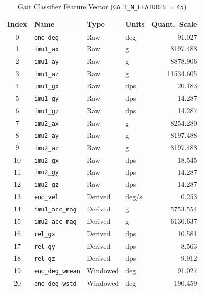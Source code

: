 \documentclass[11pt]{article}
\begin{document}
\begin{table}[H]
\centering
\caption{Gait Classifier Feature Vector (\texttt{GAIT\_N\_FEATURES = 45})}
\label{tab:gait_features}
\small
\begin{tabular}{clllr}
\toprule
\textbf{Index} & \textbf{Name} & \textbf{Type} & \textbf{Units} & \textbf{Quant.\ Scale} \\
\midrule
 0  & \texttt{enc\_deg}        & Raw      & deg   &     91.027 \\
 1  & \texttt{imu1\_ax}        & Raw      & g     &   8197.488 \\
 2  & \texttt{imu1\_ay}        & Raw      & g     &   8878.906 \\
 3  & \texttt{imu1\_az}        & Raw      & g     &  11534.605 \\
 4  & \texttt{imu1\_gx}        & Raw      & dps   &     20.183 \\
 5  & \texttt{imu1\_gy}        & Raw      & dps   &     14.287 \\
 6  & \texttt{imu1\_gz}        & Raw      & dps   &     14.287 \\
 7  & \texttt{imu2\_ax}        & Raw      & g     &   8254.280 \\
 8  & \texttt{imu2\_ay}        & Raw      & g     &   8197.488 \\
 9  & \texttt{imu2\_az}        & Raw      & g     &   8197.488 \\
10  & \texttt{imu2\_gx}        & Raw      & dps   &     18.545 \\
11  & \texttt{imu2\_gy}        & Raw      & dps   &     14.287 \\
12  & \texttt{imu2\_gz}        & Raw      & dps   &     14.287 \\
\midrule
13  & \texttt{enc\_vel}        & Derived  & deg/s &      0.253 \\
14  & \texttt{imu1\_acc\_mag}  & Derived  & g     &   5753.554 \\
15  & \texttt{imu2\_acc\_mag}  & Derived  & g     &   6130.637 \\
16  & \texttt{rel\_gx}         & Derived  & dps   &     10.581 \\
17  & \texttt{rel\_gy}         & Derived  & dps   &      8.563 \\
18  & \texttt{rel\_gz}         & Derived  & dps   &      9.912 \\
\midrule
19  & \texttt{enc\_deg\_wmean}    & Windowed & deg   &     91.027 \\
20  & \texttt{enc\_deg\_wstd}     & Windowed & deg   &    190.459 \\

\end{tabular}
\end{table}
\end{document}

